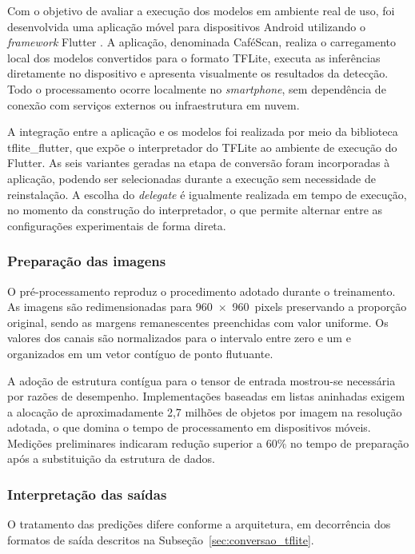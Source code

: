 \documentclass[artigo,times,capa]{iftex2024}
\begin{document}
Com o objetivo de avaliar a execução dos modelos em ambiente real de uso, foi
desenvolvida uma aplicação móvel para dispositivos Android utilizando o
\textit{framework} Flutter \cite{Flutter2024}. A aplicação, denominada
CaféScan, realiza o carregamento local dos modelos convertidos para o formato
\ac{TFLite}, executa as inferências diretamente no dispositivo e apresenta
visualmente os resultados da detecção. Todo o processamento ocorre localmente
no \textit{smartphone}, sem dependência de conexão com serviços externos ou
infraestrutura em nuvem.
 
A integração entre a aplicação e os modelos foi realizada por meio da
biblioteca tflite\_flutter, que expõe o interpretador do \ac{TFLite}
ao ambiente de execução do Flutter. As seis variantes geradas na etapa de
conversão foram incorporadas à aplicação, podendo ser selecionadas durante a
execução sem necessidade de reinstalação. A escolha do \textit{delegate} é
igualmente realizada em tempo de execução, no momento da construção do
interpretador, o que permite alternar entre as configurações experimentais de
forma direta.
 
\subsubsection{Preparação das imagens}
 
O pré-processamento reproduz o procedimento adotado durante o treinamento. As
imagens são redimensionadas para 960~$\times$~960~pixels preservando a
proporção original, sendo as margens remanescentes preenchidas com valor
uniforme. Os valores dos canais são normalizados para o intervalo entre zero e
um e organizados em um vetor contíguo de ponto flutuante.
 
A adoção de estrutura contígua para o tensor de entrada mostrou-se necessária
por razões de desempenho. Implementações baseadas em listas aninhadas exigem a
alocação de aproximadamente 2,7 milhões de objetos por imagem na resolução
adotada, o que domina o tempo de processamento em dispositivos móveis. Medições
preliminares indicaram redução superior a 60\% no tempo de preparação após a
substituição da estrutura de dados.
 
\subsubsection{Interpretação das saídas}
 
O tratamento das predições difere conforme a arquitetura, em decorrência dos
formatos de saída descritos na Subseção~\ref{sec:conversao_tflite}.
 
\end{document}
